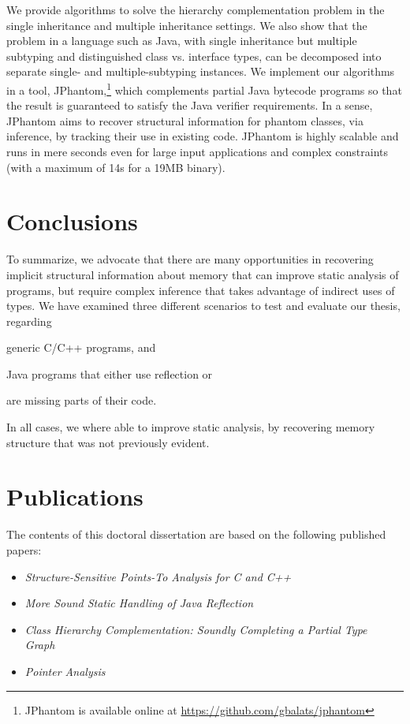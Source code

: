 \documentclass{llncs}
\begin{document}
We provide algorithms to solve the hierarchy complementation problem
in the single inheritance and multiple inheritance settings.  We also
show that the problem in a language such as Java, with single
inheritance but multiple subtyping and distinguished class
vs. interface types, can be decomposed into separate single- and
multiple-subtyping instances.  We implement our algorithms in a tool,
JPhantom,\footnote{JPhantom is available online at
  \url{https://github.com/gbalats/jphantom}} which complements partial
Java bytecode programs so that the result is guaranteed to satisfy the
Java verifier requirements. In a sense, JPhantom aims to recover
structural information for phantom classes, via inference, by tracking
their use in existing code. JPhantom is highly scalable and runs in
mere seconds even for large input applications and complex constraints
(with a maximum of 14s for a 19MB binary).

\section{Conclusions}

To summarize, we advocate that there are many opportunities in
recovering implicit structural information about memory that can
improve static analysis of programs, but require complex inference
that takes advantage of indirect uses of types. We have examined three
different scenarios to test and evaluate our thesis, regarding
\begin{inparablank}
\item generic C/C++ programs, and
\item Java programs that either use reflection or
\item are missing parts of their code.
\end{inparablank}
In all cases, we where able to improve static analysis, by recovering
memory structure that was not previously evident.

\section{Publications}

The contents of this doctoral dissertation are based on the following
published papers:

\begin{itemize}[--]
\item \emph{Structure-Sensitive Points-To Analysis for C and C++}
  \cite{structsens}
\item \emph{More Sound Static Handling of Java Reflection}
  \cite{aplas/SmaragdakisBKB15}
\item \emph{Class Hierarchy Complementation: Soundly Completing a
    Partial Type Graph}~\cite{jphantom}
\item \emph{Pointer Analysis} \cite{survey}
\end{itemize}




\end{document}
